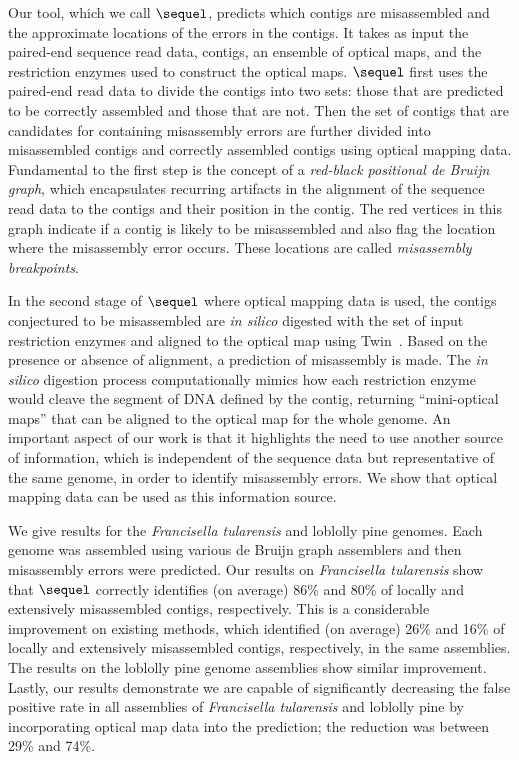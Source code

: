 \documentclass[doctor]{thesis}
\begin{document}
Our tool, which we call $\sequel$, predicts which contigs are misassembled and the approximate locations of the errors in the contigs.  It takes as input the paired-end sequence read data, contigs, an ensemble of optical maps, and the restriction enzymes used to construct the optical maps.
$\sequel$ first uses the paired-end read data to divide the contigs into two sets: those that are predicted to be correctly assembled and those that are not.  
Then the set of  contigs that are candidates for containing misassembly errors are further divided into misassembled contigs and correctly assembled contigs using optical mapping data.
Fundamental to the first step is the concept of a {\em red-black positional de Bruijn graph}, which encapsulates recurring artifacts in the alignment of the sequence read data to the contigs and their position in the contig. 
The red vertices in this graph indicate if a contig is likely to be misassembled and also flag the location where the misassembly error occurs. These locations are called {\em  misassembly breakpoints}.

In the second stage of $\sequel$ where optical mapping data is used, the contigs conjectured to be misassembled are {\em in silico} digested with the set of input restriction enzymes and aligned to the optical map using Twin~\cite{wabi2014}.  Based on the presence or absence of alignment, a prediction of misassembly is made.  The {\em in silico} digestion process computationally mimics how each restriction enzyme would cleave the segment of DNA defined by the contig, returning ``mini-optical maps'' that can be aligned to the optical map for the whole genome. An important aspect of our work is that it highlights the need to use another source of information, which is independent of the sequence data but representative of the same genome, in order to identify misassembly errors. We show that optical mapping data can be used as this information source.   
 

We give results for the {\em Francisella tularensis} and loblolly pine genomes.  Each genome was assembled using various de Bruijn graph assemblers and then misassembly errors were predicted.  Our results on {\em Francisella tularensis} show that $\sequel$ correctly identifies (on average) 86\% and 80\% of locally and extensively misassembled contigs, respectively. This is a considerable improvement on existing methods, which identified (on average)  26\% and 16\% of locally and extensively misassembled contigs, respectively, in the same assemblies. The results on the loblolly pine genome assemblies show similar improvement. Lastly, our results demonstrate we are capable of significantly decreasing the false positive rate in all assemblies of {\em Francisella tularensis} and loblolly pine by incorporating optical map data into the prediction; the reduction was between 29\% and 74\%.  
\end{document}
